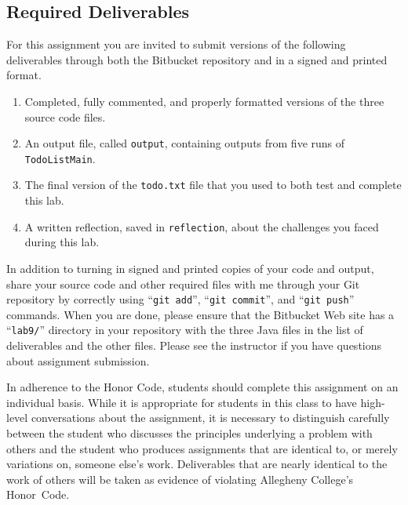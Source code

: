\subsection*{Required Deliverables}
\vspace{-0.05in}

For this assignment you are invited to submit versions of the following deliverables through both the Bitbucket
repository and in a signed and printed format.

\vspace{-0.1in}
\begin{enumerate}
    \setlength{\itemsep}{0pt}

  \item Completed, fully commented, and properly formatted versions of the three source code files.
  \item An output file, called {\tt output}, containing outputs from five runs of {\tt TodoListMain}.
  \item The final version of the {\tt todo.txt} file that you used to both test and complete this lab.
  \item A written reflection, saved in {\tt reflection}, about the challenges you faced during this lab.
        
\end{enumerate}
\vspace{-0.1in}

In addition to turning in signed and printed copies of your code and output, share your source code and other required
files with me through your Git repository by correctly using ``{\tt git add}'', ``{\tt git commit}'', and ``{\tt git
  push}'' commands. When you are done, please ensure that the Bitbucket Web site has a ``{\tt lab9/}'' directory in your
repository with the three Java files in the list of deliverables and the other files. Please see the instructor if
you have questions about assignment submission.

In adherence to the Honor Code, students should complete this assignment on an individual basis. While it is appropriate
for students in this class to have high-level conversations about the assignment, it is necessary to distinguish
carefully between the student who discusses the principles underlying a problem with others and the student who produces
assignments that are identical to, or merely variations on, someone else's work.  Deliverables that are nearly identical
to the work of others will be taken as evidence of violating Allegheny College's \mbox{Honor Code}.  





